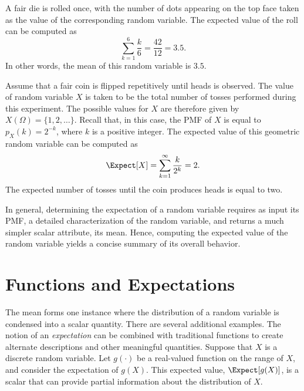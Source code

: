 \begin{example}
A fair die is rolled once, with the number of dots appearing on the top face taken as the value of the corresponding random variable.
The expected value of the roll can be computed as
\begin{equation*}
\sum_{k=1}^6 \frac{k}{6} = \frac{42}{12} = 3.5 .
\end{equation*}
In other words, the mean of this random variable is $3.5$.
\end{example}

\begin{example}
Assume that a fair coin is flipped repetitively until heads is observed.
The value of random variable $X$ is taken to be the total number of tosses performed during this experiment.
The possible values for $X$ are therefore given by $X (\Omega) = \{ 1, 2, \ldots \}$.
Recall that, in this case, the PMF of $X$ is equal to $p_X(k) = 2^{-k}$, where $k$ is a positive integer.
The expected value of this geometric random variable can be computed as
\begin{equation*}
\Expect [X] = \sum_{k=1}^{\infty} \frac{k}{2^k}
= 2.
\end{equation*}
The expected number of tosses until the coin produces heads is equal to two.
\end{example}

In general, determining the expectation of a random variable requires as input its PMF, a detailed characterization of the random variable, and returns a much simpler scalar attribute, its mean.
Hence, computing the expected value of the random variable yields a concise summary of its overall behavior.


\section{Functions and Expectations}

The mean forms one instance where the distribution of a random variable is condensed into a scalar quantity.
There are several additional examples.
The notion of an \emph{expectation} can be combined with traditional functions to create alternate descriptions and other meaningful quantities. 
Suppose that $X$ is a discrete random variable.
Let $g(\cdot)$ be a real-valued function on the range of $X$, and consider the expectation of $g(X)$.
This expected value, $\Expect [g(X)]$, is a scalar that can provide partial information about the distribution of $X$.

